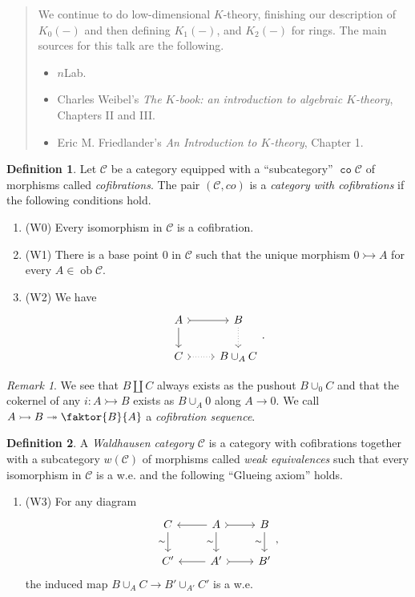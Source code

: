 \documentclass[10pt,letterpaper,cm]{nupset}
\theoremstyle{definition}
\newtheorem{definition}{Definition}
\theoremstyle{theorem}
\theoremstyle{remark}
\newtheorem{remark}{Remark}
\newcommand{\1}{\mathbf{1}}
\renewcommand{\c}{\mathscr{C}}
\newcommand{\0}{\vec 0}
\DeclareMathOperator{\ob}{ob}
\DeclareMathOperator{\co}{\mathtt{co}}
\begin{document}
\begin{abstract}
We continue to do low-dimensional $K$-theory, finishing our description of $K_0(-)$ and then defining $K_1(-)$, and $K_2(-)$ for rings. The main sources for this talk are the following.
\begin{itemize}
\item $n$Lab.
\item Charles Weibel's \textit{The $K$-book: an introduction to algebraic $K$-theory}, Chapters II and III.
\item Eric M. Friedlander's \textit{An Introduction to $K$-theory}, Chapter 1.
\end{itemize}
\end{abstract}


\begin{definition}
Let $\c$ be a category equipped with a ``subcategory'' $\co{\c}$ of morphisms called \textit{cofibrations}. The pair $(\c, co)$ is a \textit{category with cofibrations} if the following conditions hold.
\begin{enumerate}
\item (W0) Every isomorphism in $\c$ is a cofibration.
\item (W1) There is a base point $0$ in $\c$ such that the unique morphism $0 \rightarrowtail A$ for every $A \in \ob \c$.
\item (W2) We have
\[
\begin{tikzcd}
A \arrow[d] \arrow[r, tail] & B \arrow[d, dotted] \\
C \arrow[r, dotted, tail] & B \cup_A C
\end{tikzcd}.
\]
\end{enumerate}
\end{definition}

\begin{remark}
We see that $B \coprod C$ always exists as the pushout $B \cup_0 C$ and that the cokernel of any $i : A \rightarrowtail B$ exists as $B \cup_A 0$ along $A \to 0$. We call $A \rightarrowtail  B \twoheadrightarrow \faktor{B}{A}$ a \textit{cofibration sequence}.
\end{remark}

\begin{definition}
A \textit{Waldhausen category} $\c$ is a category with cofibrations together with a subcategory $w(\c)$ of morphisms called \textit{weak equivalences} such that every isomorphism in $\c$ is a w.e. and the following ``Glueing axiom'' holds.
\begin{enumerate}
\item (W3) For any diagram
\[
\begin{tikzcd}
C \arrow[d, "\sim"'] & A \arrow[d, "\sim"'] \arrow[r, tail] \arrow[l] & B \arrow[d, "\sim"'] \\
C' & A' \arrow[r, tail] \arrow[l] & B'
\end{tikzcd}, \]
the induced map $B \cup_A C \to  B' \cup_{A'} C'$ is a w.e.
\end{enumerate}
\end{definition}
\end{document}
